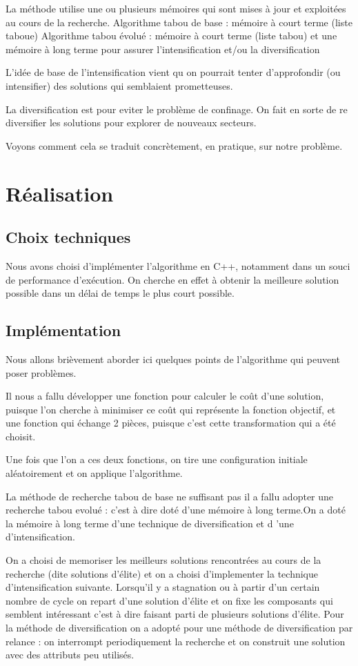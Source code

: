 \documentclass{report}
\begin{document}
La méthode utilise une ou plusieurs mémoires  qui sont mises à jour
et exploitées au cours de la recherche.
Algorithme tabou de base : mémoire à court terme (liste taboue)
Algorithme tabou évolué : mémoire à court terme (liste tabou) et une mémoire à
long terme pour assurer l’intensification et/ou la diversification

L'idée de base de l'intensification vient qu on pourrait tenter d'approfondir (ou intensifier) des solutions qui semblaient prometteuses.

La diversification est pour eviter le problème de confinage. On fait en sorte de re diversifier les solutions pour explorer de nouveaux secteurs.

Voyons comment cela se traduit concrètement, en pratique, sur notre problème.

\section{Réalisation}
\subsection{Choix techniques}
Nous avons choisi d'implémenter l'algorithme en C++, notamment dans un souci de performance d’exécution. On cherche en effet à obtenir la meilleure solution possible dans un délai de temps le plus court possible. 

\subsection{Implémentation}
 Nous allons brièvement aborder ici quelques points de l’algorithme qui peuvent poser problèmes.

Il nous a fallu développer une fonction pour calculer le coût d'une solution, puisque l'on cherche à minimiser ce coût qui représente la fonction objectif, et une fonction qui échange 2 pièces, puisque c'est cette transformation qui a été choisit.

Une fois que l'on a ces deux fonctions, on tire une configuration initiale aléatoirement et on applique l'algorithme.

La méthode de recherche tabou de base ne suffisant pas il a fallu adopter une recherche tabou evolué : c'est à dire doté d'une mémoire à long terme.On a doté la mémoire à long terme d'une technique de diversification et d 'une d'intensification.

On a choisi de memoriser les meilleurs solutions rencontrées au cours de la recherche (dite solutions d'élite) et on a choisi d'implementer la technique d'intensification suivante.
Lorsqu'il y a stagnation ou à partir d'un certain nombre de cycle on repart d'une solution d'élite
et on fixe les composants qui semblent intéressant c'est à dire faisant parti de plusieurs solutions d'élite.
Pour la méthode de diversification on a adopté pour une méthode  de diversification par relance :
on interrompt periodiquement la recherche et on construit une solution avec des attributs peu utilisés. 
\end{document}
